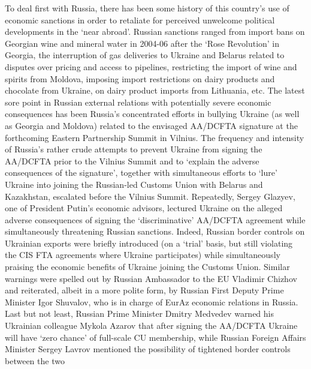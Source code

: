 To deal first with Russia, there has been some history of this country's use of economic sanctions in order to retaliate for perceived unwelcome political developments in the `near abroad'. Russian sanctions ranged from import bans on Georgian wine and mineral water in 2004-06 after the `Rose Revolution' in Georgia, the interruption of gas deliveries to Ukraine and Belarus related to disputes over pricing and access to pipelines, restricting the import of wine and spirits from Moldova, imposing import restrictions on dairy products and chocolate from Ukraine, on dairy product imports from Lithuania, etc. The latest sore point in Russian external relations with potentially severe economic consequences has been Russia's concentrated efforts in bullying Ukraine (as well as Georgia and Moldova) related to the envisaged AA/DCFTA signature at the forthcoming Eastern Partnership Summit in Vilnius. The frequency and intensity of Russia's rather crude attempts to prevent Ukraine from signing the AA/DCFTA prior to the Vilnius Summit and to `explain the adverse consequences of the signature', together with simultaneous efforts to `lure' Ukraine into joining the Russian-led Customs Union with Belarus and Kazakhstan, escalated before the Vilnius Summit. Repeatedly, Sergey Glazyev, one of President Putin's economic advisors, lectured Ukraine on the alleged adverse consequences of signing the `discriminative' AA/DCFTA agreement while simultaneously threatening Russian sanctions. Indeed, Russian border controls on Ukrainian exports were briefly introduced (on a `trial' basis, but still violating the CIS FTA agreements where Ukraine participates) while simultaneously praising the economic benefits of Ukraine joining the Customs Union. Similar warnings were spelled out by Russian Ambassador to the EU Vladimir Chizhov and reiterated, albeit in a more polite form, by Russian First Deputy Prime Minister Igor Shuvalov, who is in charge of EurAz economic relations in Russia. Last but not least, Russian Prime Minister Dmitry Medvedev warned his Ukrainian colleague Mykola Azarov that after signing the AA/DCFTA Ukraine will have `zero chance' of full-scale CU membership, while Russian Foreign Affairs Minister Sergey Lavrov mentioned the possibility of tightened border controls between the two 